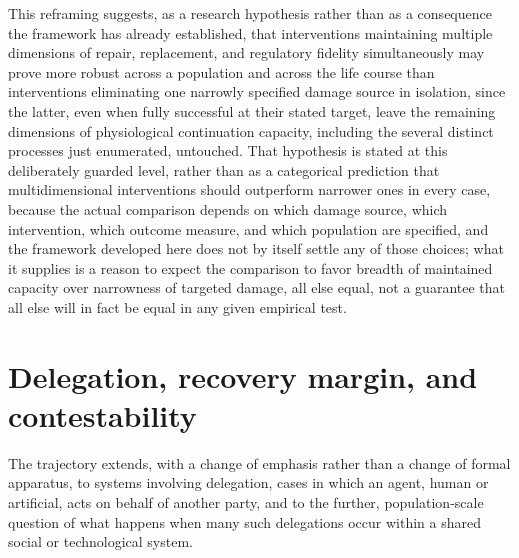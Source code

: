 \documentclass[11pt]{article}
\begin{document}
This reframing suggests, as a research hypothesis rather than as a consequence the framework has already established, that interventions maintaining multiple dimensions of repair, replacement, and regulatory fidelity simultaneously may prove more robust across a population and across the life course than interventions eliminating one narrowly specified damage source in isolation, since the latter, even when fully successful at their stated target, leave the remaining dimensions of physiological continuation capacity, including the several distinct processes just enumerated, untouched. That hypothesis is stated at this deliberately guarded level, rather than as a categorical prediction that multidimensional interventions should outperform narrower ones in every case, because the actual comparison depends on which damage source, which intervention, which outcome measure, and which population are specified, and the framework developed here does not by itself settle any of those choices; what it supplies is a reason to expect the comparison to favor breadth of maintained capacity over narrowness of targeted damage, all else equal, not a guarantee that all else will in fact be equal in any given empirical test.

\section{Delegation, recovery margin, and contestability}

The trajectory extends, with a change of emphasis rather than a change of formal apparatus, to systems involving delegation, cases in which an agent, human or artificial, acts on behalf of another party, and to the further, population-scale question of what happens when many such delegations occur within a shared social or technological system.
\end{document}
